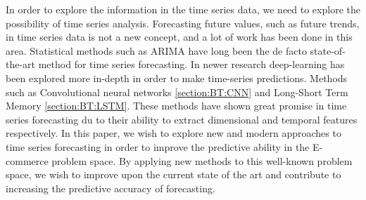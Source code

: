 In order to explore the information in the time series data, we need to explore the possibility of time series analysis.
Forecasting future values, such as future trends, in time series data is not a new concept, and a lot of work has been done in this area.
Statistical methods such as ARIMA have long been the de facto state-of-the-art method for time series forecasting.
In newer research deep-learning has been explored more in-depth in order to make time-series predictions.
Methods such as Convolutional neural networks \ref{section:BT:CNN} and Long-Short Term Memory \ref{section:BT:LSTM}.
These methods have shown great promise in time series forecasting du to their ability to extract dimensional and temporal features respectively.
In this paper, we wish to explore new and modern approaches to time series forecasting in order to improve the predictive ability in the E-commerce problem space.
By applying new methods to this well-known problem space, we wish to improve upon the current state of the art and contribute to increasing the predictive accuracy of forecasting.



